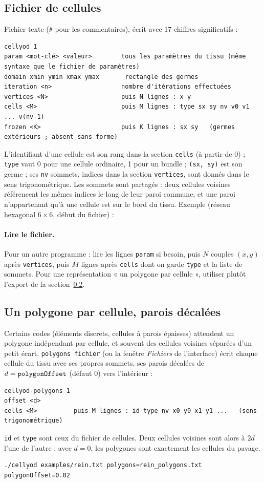 \documentclass[10pt,a4paper]{article}
\newcommand{\code}[1]{\texttt{#1}}
\begin{document}
\subsection{Fichier de cellules}

Fichier texte (\code{\#} pour les commentaires), écrit avec 17 chiffres significatifs :
\begin{lstlisting}
cellyod 1
param <mot-clé> <valeur>        tous les paramètres du tissu (même syntaxe que le fichier de paramètres)
domain xmin ymin xmax ymax       rectangle des germes
iteration <n>                   nombre d'itérations effectuées
vertices <N>                    puis N lignes : x y
cells <M>                       puis M lignes : type sx sy nv v0 v1 ... v(nv-1)
frozen <K>                      puis K lignes : sx sy   (germes extérieurs ; absent sans forme)
\end{lstlisting}
L'identifiant d'une cellule est son rang dans la section \code{cells} (à partir de 0) ; \code{type} vaut 0 pour une
cellule ordinaire, 1 pour un bundle ; \code{(sx, sy)} est son germe ; ses \code{nv} sommets, indices dans la section
\code{vertices}, sont donnés dans le sens trigonométrique. Les sommets sont partagés : deux cellules voisines
référencent les mêmes indices le long de leur paroi commune, et une paroi n'appartenant qu'à une cellule est sur
le bord du tissu. Exemple (réseau hexagonal $6\times6$, début du fichier) :


\paragraph{Lire le fichier.} Pour un autre programme : lire les lignes \code{param} si besoin, puis $N$ couples
$(x,y)$ après \code{vertices}, puis $M$ lignes après \code{cells} dont on garde \code{type} et la liste de sommets.
Pour une représentation « un polygone par cellule », utiliser plutôt l'export de la section~\ref{sec:polygones}.

\subsection{Un polygone par cellule, parois décalées}\label{sec:polygones}

Certains codes (éléments discrets, cellules à parois épaisses) attendent un polygone indépendant par cellule, et
souvent des cellules voisines séparées d'un petit écart. \code{polygons fichier} (ou la fenêtre \emph{Fichiers} de
l'interface) écrit chaque cellule du tissu avec ses propres sommets, ses parois décalées de
$d=\text{\code{polygonOffset}}$ (défaut 0) vers l'intérieur :
\begin{lstlisting}
cellyod-polygons 1
offset <d>
cells <M>          puis M lignes : id type nv x0 y0 x1 y1 ...   (sens trigonométrique)
\end{lstlisting}
\code{id} et \code{type} sont ceux du fichier de cellules. Deux cellules voisines sont alors à $2d$ l'une de l'autre ;
avec $d=0$, les polygones sont exactement les cellules du pavage.
\begin{lstlisting}
./cellyod examples/rein.txt polygons=rein_polygons.txt polygonOffset=0.02
\end{lstlisting}
\end{document}
